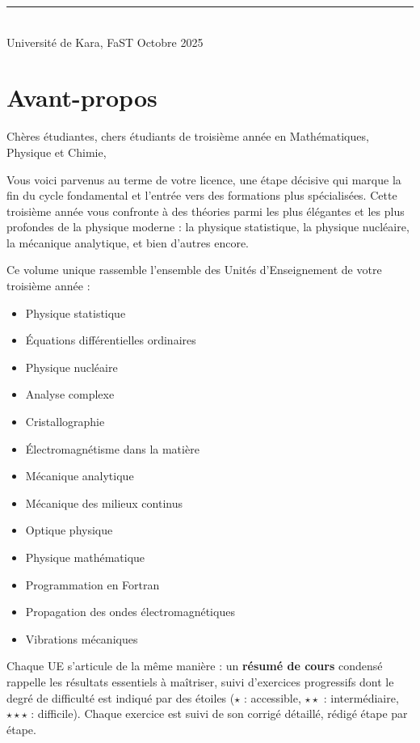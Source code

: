 \documentclass[12pt,a4paper]{article}
\begin{document}
\begin{titlepage}
\vspace{0.5cm}
\rule{\textwidth}{0.4pt}\\[0.15cm]
{\small Université de Kara, FaST \hfill Octobre 2025}

\end{titlepage}

\newpage
\thispagestyle{plain}
\pagestyle{fancy}

\section*{Avant-propos}

Chères étudiantes, chers étudiants de troisième année en Mathématiques, Physique et Chimie,

Vous voici parvenus au terme de votre licence, une étape décisive qui marque la fin du cycle fondamental et l'entrée vers des formations plus spécialisées. Cette troisième année vous confronte à des théories parmi les plus élégantes et les plus profondes de la physique moderne : la physique statistique, la physique nucléaire, la mécanique analytique, et bien d'autres encore.

Ce volume unique rassemble l'ensemble des Unités d'Enseignement de votre troisième année :

\begin{itemize}
  \item Physique statistique
  \item Équations différentielles ordinaires
  \item Physique nucléaire
  \item Analyse complexe
  \item Cristallographie
  \item Électromagnétisme dans la matière
  \item Mécanique analytique
  \item Mécanique des milieux continus
  \item Optique physique
  \item Physique mathématique
  \item Programmation en Fortran
  \item Propagation des ondes électromagnétiques
  \item Vibrations mécaniques
\end{itemize}

Chaque UE s'articule de la même manière : un \textbf{résumé de cours} condensé rappelle les résultats essentiels à maîtriser, suivi d'exercices progressifs dont le degré de difficulté est indiqué par des étoiles ($\star$ : accessible, $\star\star$ : intermédiaire, $\star\star\star$ : difficile). Chaque exercice est suivi de son corrigé détaillé, rédigé étape par étape.
\end{document}
